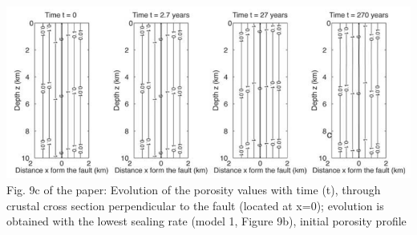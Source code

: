 \newpage

\begin{center}
\includegraphics[width=14.7cm]{python_codes/fieldstone_126/images/grfr03c}\\
{\captionfont Fig. 9c of the paper: Evolution of the porosity values with time (t), 
through crustal cross section perpendicular to the fault (located at x=0); 
evolution is obtained with the lowest sealing rate (model 1, Figure 9b),
initial porosity profile}
\end{center}

